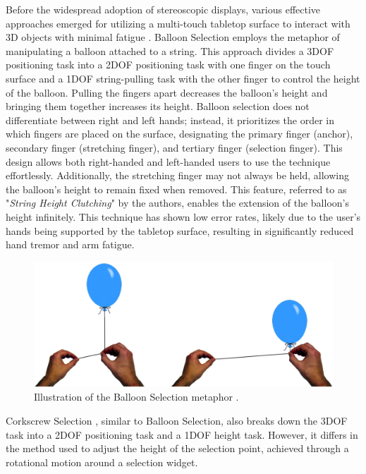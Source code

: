     Before the widespread adoption of stereoscopic displays, various effective approaches emerged for utilizing a multi-touch tabletop surface to interact with 3D objects with minimal fatigue \cite{benkoBalloonSelectionMultiFinger2007, strothoffTriangleCursorInteractions2011, daiberBalloonSelectionRevisited2012}. Balloon Selection \cite{benkoBalloonSelectionMultiFinger2007} employs the metaphor of manipulating a balloon attached to a string. This approach divides a 3DOF positioning task into a 2DOF positioning task with one finger on the touch surface and a 1DOF string-pulling task with the other finger to control the height of the balloon. Pulling the fingers apart decreases the balloon's height and bringing them together increases its height. Balloon selection does not differentiate between right and left hands; instead, it prioritizes the order in which fingers are placed on the surface, designating the primary finger (anchor), secondary finger (stretching finger), and tertiary finger (selection finger). This design allows both right-handed and left-handed users to use the technique effortlessly. Additionally, the stretching finger may not always be held, allowing the balloon's height to remain fixed when removed. This feature, referred to as "\textit{String Height Clutching}" by the authors, enables the extension of the balloon's height infinitely. This technique has shown low error rates, likely due to the user's hands being supported by the tabletop surface, resulting in significantly reduced hand tremor and arm fatigue.

    \begin{figure}[ht!]
        \centering
        \includegraphics[width=1\linewidth]{figures/balloon_selection.png}
        \caption{Illustration of the Balloon Selection metaphor \cite{benkoBalloonSelectionMultiFinger2007}.}
        \label{fig:sota_balloon}
    \end{figure}

    Corkscrew Selection \cite{daiberBalloonSelectionRevisited2012}, similar to Balloon Selection, also breaks down the 3DOF task into a 2DOF positioning task and a 1DOF height task. However, it differs in the method used to adjust the height of the selection point, achieved through a rotational motion around a selection widget.
    
